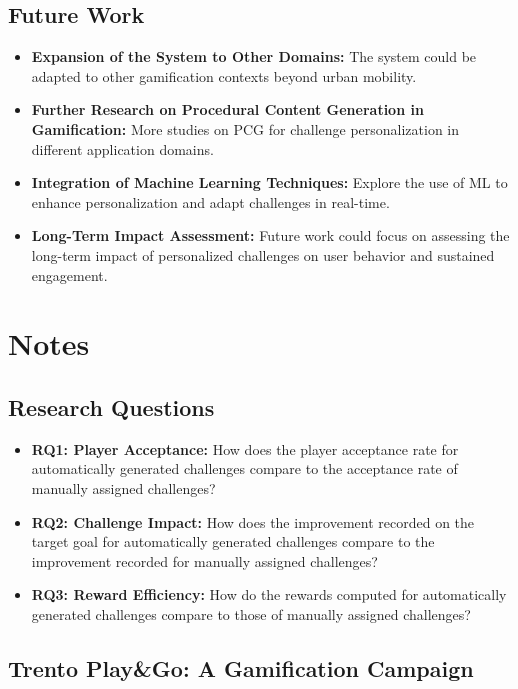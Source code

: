 \subsection{Future Work}
\begin{itemize}
    \item \textbf{Expansion of the System to Other Domains:} The system could be adapted to other gamification contexts beyond urban mobility.
    
    \item \textbf{Further Research on Procedural Content Generation in Gamification:} More studies on PCG for challenge personalization in different application domains.
    
    \item \textbf{Integration of Machine Learning Techniques:} Explore the use of ML to enhance personalization and adapt challenges in real-time.
    
    \item \textbf{Long-Term Impact Assessment:} Future work could focus on assessing the long-term impact of personalized challenges on user behavior and sustained engagement.
    
\end{itemize}

\section{Notes}
\subsection{Research Questions}

\begin{itemize}
    \item \textbf{RQ1: Player Acceptance:} How does the player acceptance rate for automatically generated challenges compare to the acceptance rate of manually assigned challenges?
    \item \textbf{RQ2: Challenge Impact:} How does the improvement recorded on the target goal for automatically generated challenges compare to the improvement recorded for manually assigned challenges?
    \item \textbf{RQ3: Reward Efficiency:} How do the rewards computed for automatically generated challenges compare to those of manually assigned challenges?
\end{itemize}

\subsection{Trento Play\&Go: A Gamification Campaign}

